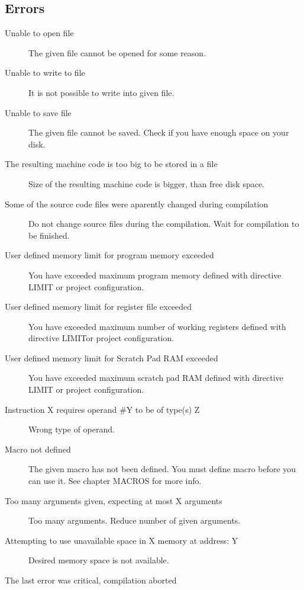     \subsection{Errors}
        \begin{description}
            \item[Unable to open file]
                The given file cannot be opened for some reason.
            \item[Unable to write to file]
                It is not possible to write into given file.
            \item[Unable to save file]
                The given file cannot be saved. Check if you have enough space on your disk.
            \item[The resulting machine code is too big to be stored in a file]
                Size of the resulting machine code is bigger, than free disk space.
            \item[Some of the source code files were aparently changed during compilation]
                Do not change source files during the compilation. Wait for compilation to be finished.
            \item[User defined memory limit for program memory exceeded]
                You have exceeded maximum program memory defined with directive LIMIT or project configuration.
            \item[User defined memory limit for register file exceeded]
                You have exceeded maximum number of working registers defined with directive LIMITor project configuration.
            \item[User defined memory limit for Scratch Pad RAM exceeded]
                You have exceeded maximum scratch pad RAM defined with directive LIMIT or project configuration.
            \item[Instruction X requires operand \#Y to be of type(s) Z]
                Wrong type of operand.
            \item[Macro not defined ]
                The given macro has not been defined. You must define macro before you can use it. See chapter MACROS for more info.
            \item[Too many arguments given, expecting at most X arguments]
                Too many arguments. Reduce number of given arguments.
            \item[Attempting to use unavailable space in X memory at address: Y ]
                Desired memory space is not available.
            \item[The last error was critical, compilation aborted]

\end{description}
